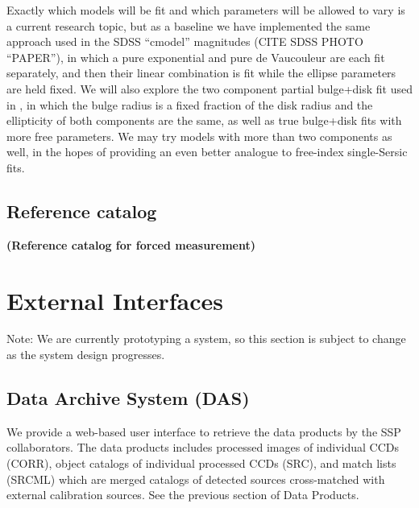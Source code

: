 \documentclass[12pt]{article}
\newcommand\tbd[1]{\textbf{\color{red}(#1)}}
\begin{document}
Exactly which models will be fit and which parameters will be allowed
to vary is a current research topic, but as a baseline we have
implemented the same approach used in the SDSS ``cmodel'' magnitudes
(CITE SDSS PHOTO ``PAPER''),
in which a pure exponential and pure de Vaucouleur are each fit
separately, and then their linear combination is fit while the ellipse
parameters are held fixed.  We will also explore the two component
partial bulge+disk fit used in \cite{Miller2013}, in which the bulge
radius is a fixed fraction of the disk radius and the ellipticity of
both components are the same, as well as true bulge+disk fits with
more free parameters.  We may try models with more than two components
as well, in the hopes of providing an even better analogue to
free-index single-Sersic fits.

\subsection{Reference catalog}

\tbd{Reference catalog for forced measurement}


\section{External Interfaces}
\label{sec:interfaces}

Note: We are currently prototyping a system, so this section is subject
to change as the system design progresses.

\subsection{Data Archive System (DAS)}
We provide a web-based user interface to retrieve the data products by
the SSP collaborators. The data products includes processed images of
individual CCDs (CORR), object catalogs of individual processed CCDs (SRC),
and  match lists (SRCML) which are merged catalogs of detected sources
cross-matched with external calibration sources. See the previous
section of Data Products.
\end{document}
